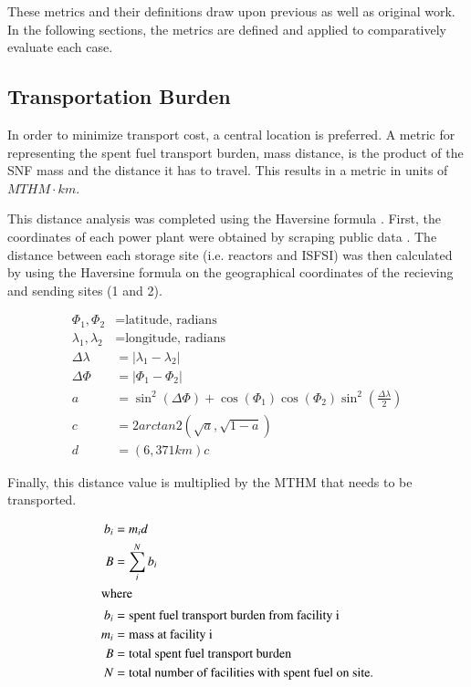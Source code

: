 These metrics and their definitions draw upon previous 
\cite{freeze_siting_2015,ISRG_book_2016} as well as original work.  In the 
following sections, the metrics are defined and applied to comparatively 
evaluate each case.

\subsection{Transportation Burden}
 In order to minimize transport cost, a central location is preferred. A metric 
 for representing the spent fuel transport burden, mass distance, is the product 
 of the \gls{SNF} mass and the distance it has to travel. This results in a 
 metric in units of $MTHM\cdot km$. 
 
 This distance analysis was completed using the Haversine formula 
 \cite{shumaker_astronomical_1984}. First, the 
 coordinates of each power plant were obtained by scraping public data 
 \cite{wikipedia}.  The distance between each storage site (i.e. reactors and 
 \gls{ISFSI}) was then calculated by using the Haversine formula on the 
 geographical coordinates of the recieving and sending sites (1 and 2). 

 \begin{align} 
         \Phi_1,\Phi_2&= \mbox{latitude, radians}\\
         \lambda_1,\lambda_2 &= \mbox{longitude, radians}\\
         \Delta\lambda &= \left|\lambda_1 - \lambda_2\right|\\
         \Delta\Phi &= \left|\Phi_1 - \Phi_2\right|\\
         a&=\sin^2(\Delta\Phi)+\cos(\Phi_1)\cos(\Phi_2)\sin^2{\left(\frac{\Delta\lambda}{2}\right)}\\
         c &= 2arctan2(\sqrt{a},\sqrt{1-a})\\
         d &=  (6,371km)c
 \end{align}


Finally, this distance value is multiplied by the \gls{MTHM} that needs to be transported.


\begin{align}
        b_i &= m_id\\
        B &= \sum_i^N b_i\\
        \intertext{where}
        b_i &= \mbox{spent fuel transport burden from facility i}\\
        m_i &= \mbox{mass at facility i}\\
        B &= \mbox{total spent fuel transport burden}\\
        N &= \mbox{total number of facilities with spent fuel on site.}
\end{align}

